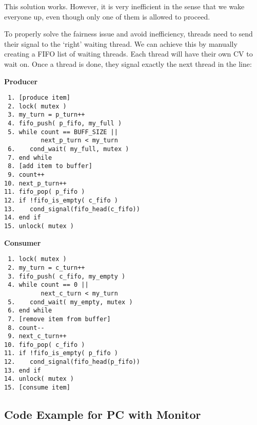 This solution works.
However, it is very inefficient in the sense that we wake everyone up, even though only one of them is allowed to proceed.

To properly solve the fairness issue and avoid inefficiency, threads need to send their signal to the `right' waiting thread.
We can achieve this by manually creating a FIFO list of waiting threads.
Each thread will have their own CV to wait on.
Once a thread is done, they signal exactly the next thread in the line:

\newpage

\begin{multicols}{2}
    \small
    \textbf{Producer}
    \begin{verbatim}
 1. [produce item]
 2. lock( mutex )
 3. my_turn = p_turn++
 4. fifo_push( p_fifo, my_full )
 5. while count == BUFF_SIZE ||
          next_p_turn < my_turn
 6.    cond_wait( my_full, mutex )
 7. end while
 8. [add item to buffer]
 9. count++
10. next_p_turn++
11. fifo_pop( p_fifo )
12. if !fifo_is_empty( c_fifo )
13.    cond_signal(fifo_head(c_fifo))
14. end if
15. unlock( mutex )
    \end{verbatim}
    \columnbreak
    \textbf{Consumer}\vspace{-2em}
    \begin{verbatim}
 1. lock( mutex )
 2. my_turn = c_turn++
 3. fifo_push( c_fifo, my_empty )
 4. while count == 0 ||
          next_c_turn < my_turn
 5.    cond_wait( my_empty, mutex )
 6. end while
 7. [remove item from buffer]
 8. count--
 9. next_c_turn++
10. fifo_pop( c_fifo )
11. if !fifo_is_empty( p_fifo )
12.    cond_signal(fifo_head(p_fifo))
13. end if
14. unlock( mutex )
15. [consume item]
    \end{verbatim}
\end{multicols}
\vspace{-2em}

\subsection*{Code Example for PC with Monitor}

